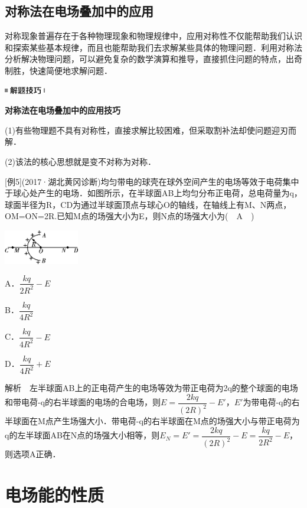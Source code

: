 \subsection{对称法在电场叠加中的应用}

对称现象普遍存在于各种物理现象和物理规律中，应用对称性不仅能帮助我们认识和探索某些基本规律，而且也能帮助我们去求解某些具体的物理问题．利用对称法分析解决物理问题，可以避免复杂的数学演算和推导，直接抓住问题的特点，出奇制胜，快速简便地求解问题．

\begin{center}\includegraphics[width=0.70833in,height=0.125in]{media/image37.png}

\textbf{对称法在电场叠加中的应用技巧}
\end{center}


(1)有些物理题不具有对称性，直接求解比较困难，但采取割补法却使问题迎刃而解．

(2)该法的核心思想就是变不对称为对称．

{[}例5{]}(2017·湖北黄冈诊断)均匀带电的球壳在球外空间产生的电场等效于电荷集中于球心处产生的电场．如图所示，在半球面AB上均匀分布正电荷，总电荷量为q，球面半径为R，CD为通过半球面顶点与球心O的轴线，在轴线上有M、N两点，OM=ON=2R.已知M点的场强大小为E，则N点的场强大小为(　A　)

\begin{center}\includegraphics[width=1.29167in,height=0.59375in]{media/image267.png}\end{center}

A．$\dfrac{kq}{2R^2}-E$ 

B．$\dfrac{kq}{4R^2}$

C．$\dfrac{kq}{4R^2}-E$ 

D．$\dfrac{kq}{4R^2}+E$

解析　左半球面AB上的正电荷产生的电场等效为带正电荷为2q的整个球面的电场和带电荷-q的右半球面的电场的合电场，则$E=\dfrac{2kq}{(2R)^2}-E'$，$E'$为带电荷-q的右半球面在M点产生场强大小．带电荷-q的右半球面在M点的场强大小与带正电荷为q的左半球面AB在N点的场强大小相等，则$E_N=E'=\dfrac{2kq}{(2R)^2} -E=\dfrac{kq}{2R^2} -E$，则选项A正确．
\newpage
\section{电场能的性质}



